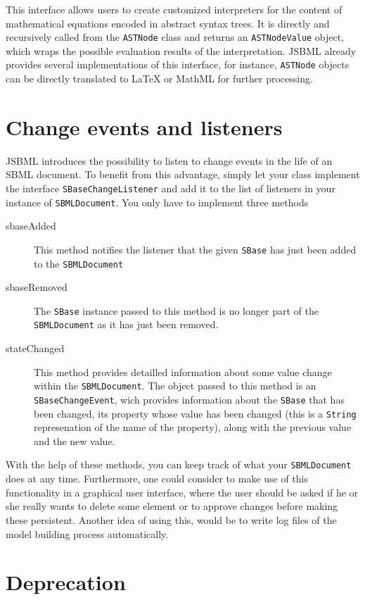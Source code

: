 \documentclass[
  letterpaper,
  11pt,
  headsepline,
  pointlessnumbers,
  tablecaptionabove,
  headinclude,
  appendixprefix,
  idxtotoc,
  bibtotoc
]{scrartcl}
\begin{document}
This interface allows users to create customized interpreters for the
content of mathematical equations encoded in abstract syntax trees. It
is directly and recursively called from the \verb!ASTNode! class and returns
an \verb!ASTNodeValue! object, which wraps the possible evaluation results of
the interpretation. JSBML already provides several implementations of
this interface, for instance, \verb!ASTNode! objects can be directly translated
to LaTeX or MathML for further processing.

\section{Change events and listeners}

JSBML introduces the possibility to listen to change events in the life of an
SBML document. To benefit from this advantage, simply let your class implement
the interface \verb!SBaseChangeListener! and add it to the list of listeners in
your instance of  \verb!SBMLDocument!. You only have to implement three methods
\begin{description}
 \item[sbaseAdded] This method notifies the listener that the given \verb!SBase!
   has just been added to the \verb!SBMLDocument!
 \item[sbaseRemoved] The \verb!SBase! instance passed to this method is no
   longer part of the \verb!SBMLDocument! as it has just been removed.
 \item[stateChanged] This method provides detailled information about some value
   change within the \verb!SBMLDocument!. The object passed to this method is
   an \verb!SBaseChangeEvent!, wich provides information about the \verb!SBase!
   that has been changed, its property whose value has been changed (this is a
   \verb!String! represenation of the name of the property), along with the
   previous value and the new value.
\end{description}
With the help of these methods, you can keep track of what your
\verb!SBMLDocument! does at any time. Furthermore, one could consider to make
use of this functionality in a graphical user interface, where the user should
be asked if he or she really wants to delete some element or to approve changes
before making these persistent. Another idea of using this, would be to write
log files of the model building process automatically.


\section{Deprecation}
\end{document}
